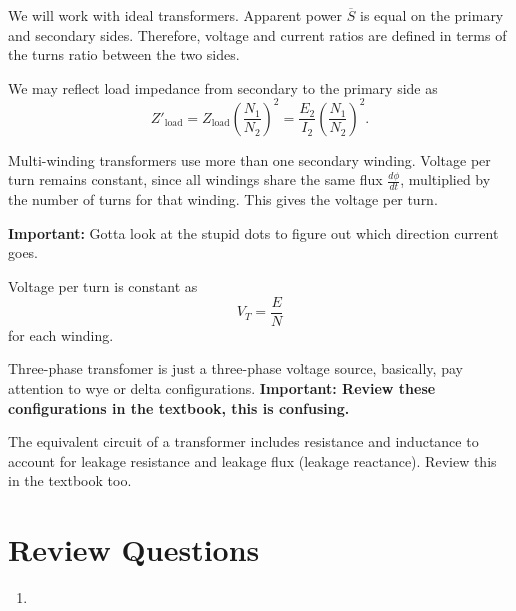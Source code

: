 \documentclass{article}
\begin{document}
We will work with ideal transformers. Apparent power \(\overline{S}\) is equal on the primary and secondary sides. Therefore, voltage and current ratios are defined in terms of the turns ratio between the two sides.

We may reflect load impedance from secondary to the primary side as
\[
	Z'_{\mathrm{load}} = Z_{\mathrm{load}}(\frac{N_1}{N_2})^2 = \frac{E_2}{I_2}(\frac{N_1}{N_2})^2.
\]

Multi-winding transformers use more than one secondary winding. Voltage per turn remains constant, since all windings share the same flux \(\frac{d\phi}{dt}\), multiplied by the number of turns for that winding. This gives the voltage per turn. 

\textbf{Important:} Gotta look at the stupid dots to figure out which direction current goes.

Voltage per turn is constant as
\[
  V_T = \frac{E}{N}
\]
for each winding.

Three-phase transfomer is just a three-phase voltage source, basically, pay attention to wye or delta configurations. \textbf{Important: Review these configurations in the textbook, this is confusing.}

The equivalent circuit of a transformer includes resistance and inductance to account for leakage resistance and leakage flux (leakage reactance). Review this in the textbook too.

\setcounter{section}{10}
\setcounter{subsection}{2}
\section{Review Questions}
\begin{enumerate}[label=\thesubsection]
	\item
\end{enumerate}
\end{document}
